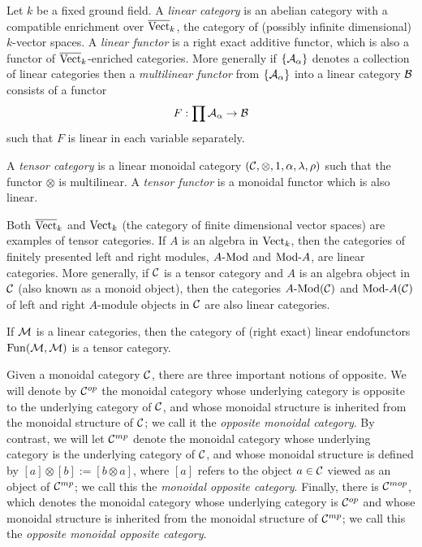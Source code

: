 \documentclass{amsart}
\begin{document}
	Let $k$ be a fixed ground field. A {\em linear category} is an abelian category with a compatible enrichment over $\overline{\mathrm{Vect}}_k$, the category of (possibly infinite dimensional) $k$-vector spaces. 
A {\em linear functor} is a right exact additive functor, which is also a functor of $\overline{\mathrm{Vect}}_k$-enriched categories. 
More generally if $\{\mathcal A_\alpha\}$ denotes a collection of linear categories then a {\em multilinear functor} from $\{\mathcal A_\alpha\}$ into a linear category $\mathcal B$ consists of a functor
\begin{equation*}
	F: \prod \mathcal A_\alpha \to \mathcal B
\end{equation*}
such that $F$ is linear in each variable separately. 

\begin{definition}
	A {\em tensor category} is a linear monoidal category $(\mathcal C, \otimes, 1, \alpha, \lambda, \rho)$ such that the functor $\otimes$ is multilinear. A {\em tensor functor} is a monoidal functor which is also linear.
\end{definition}

\begin{example}
	Both $\overline{\mathrm{Vect}}_k$ and $\mathrm{Vect}_k$ (the category of finite dimensional vector spaces) are examples of tensor categories. If $A$ is an algebra in $\mathrm{Vect}_k$, then the categories of finitely presented left and right modules, $\Mod{A}{}$ and $\Mod{}{A}$, are linear categories. More generally, if $\mathcal C$ is a tensor category and $A$ is an algebra object in $\mathcal C$ (also known as a monoid object), then the categories $\Mod{A}{}(\cC)$ and $\Mod{}{A}(\cC)$ of left and right $A$-module objects in $\mathcal C$ are also linear categories.
\end{example}

\begin{example}
	If $\mathcal M$ is a linear categories, then the category of (right exact) linear endofunctors $\operatorname{Fun}(\mathcal M, \mathcal M)$ is a tensor category. 
\end{example}

Given a monoidal category $\mathcal C$, there are three important notions of opposite. We will denote by $\mathcal C^{{op}}$ the monoidal category whose underlying category is opposite to the underlying  category of $\mathcal C$, and whose monoidal structure is inherited from the monoidal structure of $\mathcal C$; we call it the {\em opposite monoidal category}.  By contrast, we will let $\mathcal C^{{mp}}$ denote the monoidal category whose underlying category is the underlying category of $\mathcal C$, and whose monoidal structure is defined by $[a] \otimes [b] := [b \otimes a]$, where $[a]$ refers to the object $a \in \mathcal C$ viewed as an object of $\mathcal C^{{mp}}$; we call this the {\em monoidal opposite category}.  Finally, there is $\mathcal C^{{mop}}$, which denotes the monoidal category whose underlying  category is $\mathcal C^{{op}}$ and whose monoidal structure is inherited from the monoidal structure of $\mathcal C^{{mp}}$; we call this the {\em opposite monoidal opposite category}.
\end{document}
